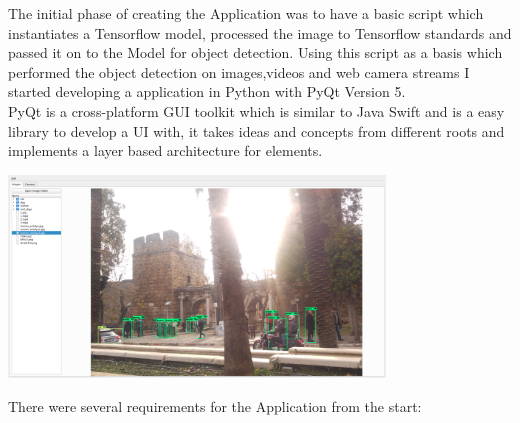 

The initial phase of creating the Application was to have a basic script which instantiates a Tensorflow model, processed the image to
Tensorflow standards and passed it on to the Model for object detection. Using this script as a basis which performed the object detection
on images,videos and web camera streams I started developing a application in Python with PyQt Version 5.\\
PyQt is a cross-platform GUI toolkit which is similar to Java Swift and is a easy library to develop a UI with, it takes ideas and concepts
from different roots and implements a layer based architecture for elements.
\begin{center}
    \includegraphics[width=0.75\textwidth]{images/application/Application.png}
\end{center}
There were several requirements for the Application from the start:
